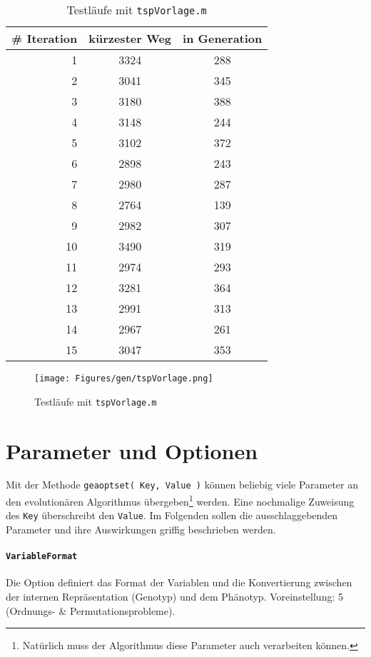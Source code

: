 \begin{table}[h]
\begin{tabular}{ | r | c | c | }
  \hline
  \# Iteration & kürzester Weg & in Generation \\
  \hline
  1  & 3324 & 288 \\
  2  & 3041 & 345 \\
  3  & 3180 & 388 \\
  4  & 3148 & 244 \\
  5  & 3102 & 372 \\
  6  & 2898 & 243 \\
  7  & 2980 & 287 \\
  8  & 2764 & 139 \\
  9  & 2982 & 307 \\
  10 & 3490 & 319 \\
  11 & 2974 & 293 \\
  12 & 3281 & 364 \\
  13 & 2991 & 313 \\
  14 & 2967 & 261 \\
  15 & 3047 & 353 \\
  \hline
\end{tabular}
\caption{Testläufe mit {\tt tspVorlage.m}}\label{testlaeufe}
\end{table}

\begin{figure}[h!]
  \centering
  \texttt{[image: Figures/gen/tspVorlage.png]}
  \caption{Testläufe mit {\tt tspVorlage.m}}\label{fig.testlaeufe}
\end{figure}


\section{Parameter und Optionen}

Mit der Methode {\tt geaoptset( Key, Value )} können beliebig viele
Parameter an den evolutionären Algorithmus übergeben\footnote{Natürlich
muss der Algorithmus diese Parameter auch verarbeiten können.} werden.
Eine nochmalige Zuweisung des {\tt Key} überschreibt den {\tt Value}.
Im Folgenden sollen die ausschlaggebenden Parameter und
ihre Auswirkungen griffig beschrieben werden.


\paragraph{{\tt VariableFormat}} Die Option definiert das Format der Variablen
und die Konvertierung zwischen der internen Repräsentation (Genotyp) und dem
Phänotyp.
Voreinstellung: 5 (Ordnungs- \& Permutationsprobleme).

